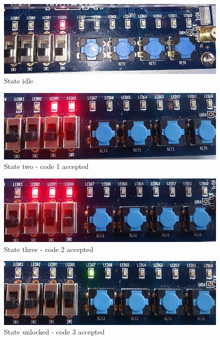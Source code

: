 \begin{enumerate}
\begin{figure}[h!]
	\centering
	\includegraphics[scale=0.5]{pictures/Oevelse7/opg2/StateIdle.JPG}
	\caption{State idle}
	\label{fig:}
\end{figure}
		
\begin{figure}[h!]
	\centering
	\includegraphics[scale=0.45]{pictures/Oevelse7/opg2/StateTwo.JPG}
	\caption{State two - code 1 accepted}
	\label{fig:}
\end{figure}

\begin{figure}[h]
	\centering
	\includegraphics[scale=0.5]{pictures/Oevelse7/opg2/StateThree.JPG}
	\caption{State three - code 2 accepted}
	\label{fig:}
\end{figure}

\begin{figure}[h]
	\centering
	\includegraphics[scale=0.5]{pictures/Oevelse7/opg2/StateUnlocked.JPG}
	\caption{State unlocked - code 3 accepted}
	\label{fig:}
\end{figure}


\end{enumerate}
